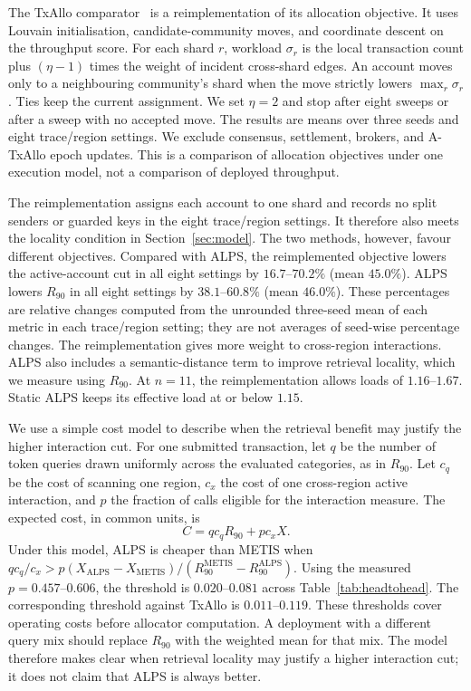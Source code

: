 \documentclass[conference,letterpaper]{IEEEtran}
\begin{document}
The TxAllo comparator~\cite{txallo2023} is a reimplementation of its
allocation objective. It uses Louvain initialisation, candidate-community moves,
and coordinate descent on the throughput score. For each shard $r$, workload
$\sigma_r$ is the local transaction count plus $(\eta-1)$ times the weight of
incident cross-shard edges. An account moves only to a neighbouring
community's shard when the move strictly lowers $\max_r\sigma_r$. Ties keep
the current assignment. We set $\eta=2$ and stop after eight sweeps or after
a sweep with no accepted move. The results are means over three seeds and
eight trace/region settings. We exclude consensus, settlement, brokers, and
A-TxAllo epoch updates. This is a comparison of allocation objectives under
one execution model, not a comparison of deployed throughput.

The reimplementation assigns each account to one shard and records no split
senders or guarded keys in the eight trace/region settings. It therefore also
meets the locality condition in Section~\ref{sec:model}. The two methods,
however, favour different objectives. Compared with ALPS, the reimplemented
objective lowers the active-account cut in all eight settings by
$16.7$--$70.2\%$ (mean $45.0\%$). ALPS lowers $R_{90}$ in all eight settings
by $38.1$--$60.8\%$ (mean $46.0\%$). These percentages are relative changes
computed from the unrounded three-seed mean of each metric in each trace/region
setting; they are not averages of seed-wise percentage changes. The
reimplementation gives more weight
to cross-region interactions. ALPS also includes a semantic-distance term to
improve retrieval locality, which we measure using $R_{90}$. At $n=11$, the
reimplementation allows loads of $1.16$--$1.67$. Static ALPS keeps its
effective load at or below $1.15$.

We use a simple cost model to describe when the retrieval benefit may
justify the higher interaction cut. For one submitted transaction, let $q$ be
the number of token queries drawn uniformly across the evaluated categories,
as in $R_{90}$. Let $c_q$ be the cost of scanning one region, $c_x$ the cost
of one cross-region active interaction, and $p$ the fraction of calls eligible
for the interaction measure. The expected cost, in common units, is
\[
C=q c_q R_{90}+p c_x X.
\]
Under this model, ALPS is cheaper than METIS when
$q c_q/c_x>p(X_{\mathrm{ALPS}}-X_{\mathrm{METIS}})/
(R_{90}^{\mathrm{METIS}}-R_{90}^{\mathrm{ALPS}})$. Using the measured
$p=0.457$--$0.606$, the threshold is $0.020$--$0.081$ across
Table~\ref{tab:headtohead}. The corresponding threshold against TxAllo is
$0.011$--$0.119$. These thresholds cover operating costs before allocator
computation. A deployment with a different query mix should replace $R_{90}$
with the weighted mean for that mix. The model therefore makes clear when
retrieval locality may justify a higher interaction cut; it does not claim
that ALPS is always better.
\end{document}
